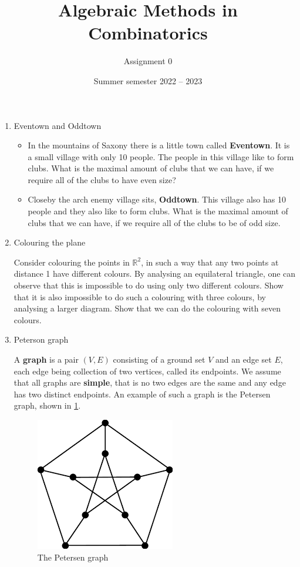 \documentclass[kulak]{tplt}
\title{Algebraic Methods in Combinatorics}
\author{Assignment 0}
\date{Summer semester 2022 -- 2023}
\theoremstyle{definition}
\newcommand{\R}{\mathbb{R}}
\begin{document}
\maketitle
\begin{enumerate}
\item Eventown and Oddtown

\begin{itemize}
\item In the mountains of Saxony there is a little town called \textbf{Eventown}.
It is a small village with only 10 people.
The people in this village like to form clubs.
What is the maximal amount of clubs that we can have, if we require all of the clubs to have even size?

\item Closeby the arch enemy village sits, \textbf{Oddtown}.
This village also has 10 people and they also like to form clubs. 
What is the maximal amount of clubs that we can have, if we require all of the clubs to be of odd size.
\end{itemize}

\item Colouring the plane

Consider colouring the points in $\R^2$, in such a way that any two points at distance 1 have different colours.
By analysing an equilateral triangle, one can observe that this is impossible to do using only two different colours.
Show that it is also impossible to do such a colouring with three colours, by analysing a larger diagram. 
Show that we can do the colouring with seven colours.

\item Peterson graph

A \textbf{graph} is a pair $(V, E)$ consisting of a ground set $V$ and an edge set $E$, each edge being collection of two vertices, called its endpoints.
We assume that all graphs are \textbf{simple}, that is no two edges are the same and any edge has two distinct endpoints.
An example of such a graph is the Petersen graph, shown in \cref{fig:pet}.

\begin{figure}[h]
\centering
\includegraphics[scale=0.5]{../imgs/petersen.png}
\caption{The Petersen graph\label{fig:pet}}
\end{figure}



\end{enumerate}
\end{document}
